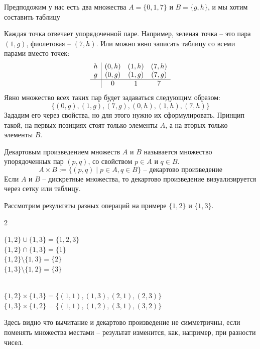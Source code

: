 Предподожим у нас есть два множества $A=\{0,1,7\}$ и $B=\{g,h\}$, и мы хотим составить таблицу
\begin{figure}
\centering
{}
\end{figure}
Каждая точка отвечает упорядоченной паре. Например, зеленая точка -- это пара $(1,g)$, фиолетовая -- $(7,h)$. Или можно явно записать таблицу со всеми парами вместо точек:
\[\begin{array}{c|ccc}
h & (0,h) & (1,h) & (7,h) \\
g & (0,g) & (1,g) & (7,g) \\
\hline
 & 0 & 1 & 7 \\
\end{array}\]
Явно множество всех таких пар будет задаваться следующим образом:
\[\{(0,g),(1,g),(7,g),(0,h),(1,h),(7,h)\}\]
Зададим его через свойства, но для этого нужно их сформулировать. Принцип такой, на первых позициях стоят только элементы $A$, а на вторых только элементы $B$.
\begin{definition}\label{def:Dprod}
Декартовым произведением множеств $A$ и $B$ называется множество упорядоченных пар $(p,q)$, со свойством $p\in A$ и $q\in B$.
\[A\times B := \{(p,q)\mid p\in A,q\in B\}\text{ -- декартово произведение}\]
Если $A$ и $B$ -- дискретные множества, то декартово произведение визуализируется через сетку или таблицу.
\end{definition}
\begin{example}
Рассмотрим результаты разных операций на примере $\{1,2\}$ и $\{1,3\}$.
\begin{multicols}{2}
\begin{center}
\noindent
$\{1,2\}\cup \{1,3\}=\{1,2,3\}$ \\
$\{1,2\}\cap \{1,3\}=\{1\}$ \\
$\{1,2\}\setminus \{1,3\}=\{2\}$ \\
$\{1,3\}\setminus \{1,2\}=\{3\}$
\end{center}
\columnbreak
\begin{center}
\noindent
\ \\
$\{1,2\}\times \{1,3\}=\{(1,1),(1,3),(2,1),(2,3)\}$\\
$\{1,3\}\times \{1,2\}=\{(1,1),(1,2),(3,1),(3,2)\}$
\end{center}
\end{multicols}
Здесь видно что вычитание и декартово произведение не симметричны, если поменять множества местами -- результат изменится, как, например, при разности чисел.
\end{example}


